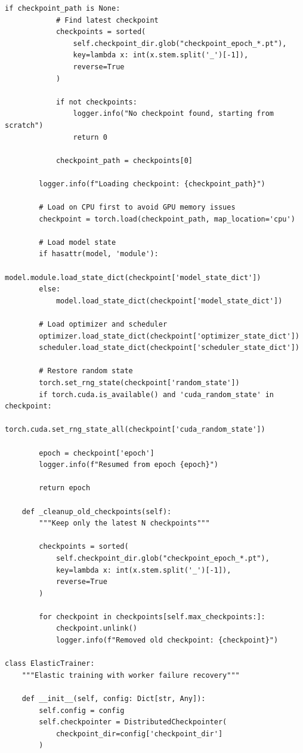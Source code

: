 \begin{lstlisting}[style=python, caption=Robust Checkpointing for Distributed Training]
        if checkpoint_path is None:
            # Find latest checkpoint
            checkpoints = sorted(
                self.checkpoint_dir.glob("checkpoint_epoch_*.pt"),
                key=lambda x: int(x.stem.split('_')[-1]),
                reverse=True
            )

            if not checkpoints:
                logger.info("No checkpoint found, starting from scratch")
                return 0

            checkpoint_path = checkpoints[0]

        logger.info(f"Loading checkpoint: {checkpoint_path}")

        # Load on CPU first to avoid GPU memory issues
        checkpoint = torch.load(checkpoint_path, map_location='cpu')

        # Load model state
        if hasattr(model, 'module'):
            model.module.load_state_dict(checkpoint['model_state_dict'])
        else:
            model.load_state_dict(checkpoint['model_state_dict'])

        # Load optimizer and scheduler
        optimizer.load_state_dict(checkpoint['optimizer_state_dict'])
        scheduler.load_state_dict(checkpoint['scheduler_state_dict'])

        # Restore random state
        torch.set_rng_state(checkpoint['random_state'])
        if torch.cuda.is_available() and 'cuda_random_state' in checkpoint:
            torch.cuda.set_rng_state_all(checkpoint['cuda_random_state'])

        epoch = checkpoint['epoch']
        logger.info(f"Resumed from epoch {epoch}")

        return epoch

    def _cleanup_old_checkpoints(self):
        """Keep only the latest N checkpoints"""

        checkpoints = sorted(
            self.checkpoint_dir.glob("checkpoint_epoch_*.pt"),
            key=lambda x: int(x.stem.split('_')[-1]),
            reverse=True
        )

        for checkpoint in checkpoints[self.max_checkpoints:]:
            checkpoint.unlink()
            logger.info(f"Removed old checkpoint: {checkpoint}")

class ElasticTrainer:
    """Elastic training with worker failure recovery"""

    def __init__(self, config: Dict[str, Any]):
        self.config = config
        self.checkpointer = DistributedCheckpointer(
            checkpoint_dir=config['checkpoint_dir']
        )


\end{lstlisting}
